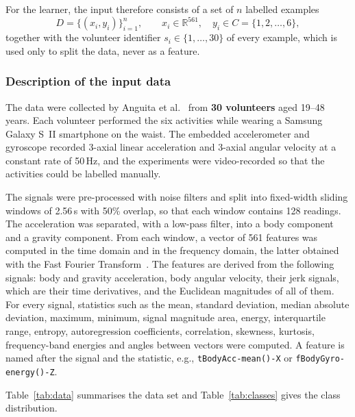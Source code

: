 \documentclass[a4paper, 11pt]{article}
\begin{document}
For the learner, the input therefore consists of a set of $n$ labelled examples
\[
  D = \{(x_i, y_i)\}_{i=1}^{n}, \qquad x_i \in \mathbb{R}^{561}, \quad y_i \in C = \{1, 2, \dots, 6\},
\]
together with the volunteer identifier $s_i \in \{1,\dots,30\}$ of every example, which is used only to split the data, never as a feature.

\subsubsection{Description of the input data}

The data were collected by Anguita et al.~\cite{anguita2013} from \textbf{30 volunteers} aged 19--48 years. Each volunteer performed the six activities while wearing a Samsung Galaxy S~II smartphone on the waist. The embedded accelerometer and gyroscope recorded 3-axial linear acceleration and 3-axial angular velocity at a constant rate of 50\,Hz, and the experiments were video-recorded so that the activities could be labelled manually.

The signals were pre-processed with noise filters and split into fixed-width sliding windows of 2.56\,s with 50\% overlap, so that each window contains 128 readings. The acceleration was separated, with a low-pass filter, into a body component and a gravity component. From each window, a vector of 561 features was computed in the time domain and in the frequency domain, the latter obtained with the Fast Fourier Transform~\cite{anguita2013}. The features are derived from the following signals: body and gravity acceleration, body angular velocity, their jerk signals, which are their time derivatives, and the Euclidean magnitudes of all of them. For every signal, statistics such as the mean, standard deviation, median absolute deviation, maximum, minimum, signal magnitude area, energy, interquartile range, entropy, autoregression coefficients, correlation, skewness, kurtosis, frequency-band energies and angles between vectors were computed. A feature is named after the signal and the statistic, e.g., \texttt{tBodyAcc-mean()-X} or \texttt{fBodyGyro-energy()-Z}.

Table~\ref{tab:data} summarises the data set and Table~\ref{tab:classes} gives the class distribution.
\end{document}
